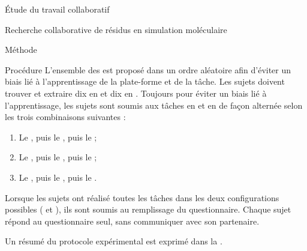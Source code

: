 \documentclass[myfrancais]{mythesis}
\begin{document}
\begin{mypart}{Étude du travail collaboratif}
\begin{mychapter}{Recherche collaborative de résidus en simulation moléculaire}
\begin{mysection}{Méthode}
\begin{mysubsection}{Procédure}
					L'ensemble des  est proposé dans un ordre aléatoire afin d'éviter un biais lié à l'apprentissage de la plate-forme et de la tâche.
					Les sujets doivent trouver et extraire dix  en  et dix  en .
					Toujours pour éviter un biais lié à l'apprentissage, les sujets sont soumis aux tâches en  et en  de façon alternée selon les trois combinaisons suivantes :
					\begin{enumerate}
						\item Le  , puis le  , puis le  ;
						\item Le  , puis le  , puis le  ;
						\item Le  , puis le  , puis le  .
					\end{enumerate}

					Lorsque les sujets ont réalisé toutes les tâches dans les deux configurations possibles ( et ), ils sont soumis au remplissage du questionnaire.
					Chaque sujet répond au questionnaire seul, sans communiquer avec son partenaire.

					Un résumé du protocole expérimental est exprimé dans la .


\end{mysubsection}
\end{mysection}
\end{mychapter}
\end{mypart}
\end{document}
